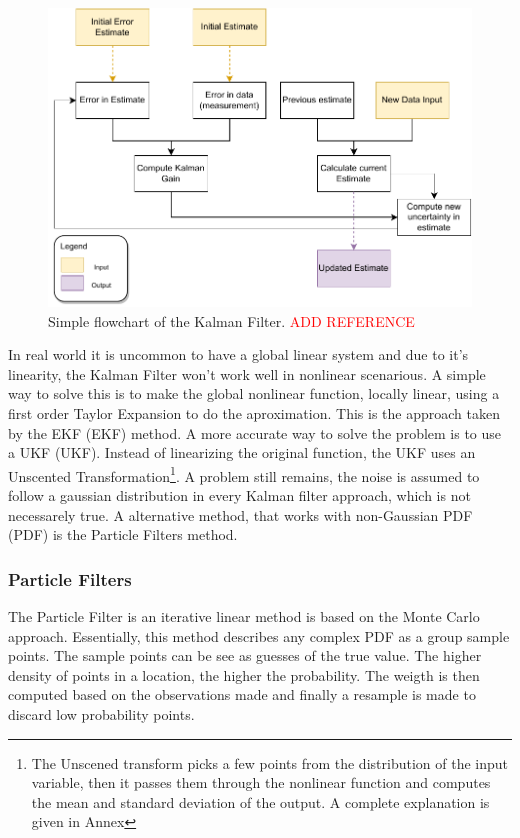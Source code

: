 \begin{figure}[H]
    \centering
    \includegraphics[width=0.5\linewidth]{images/background/Kalman-diagram.pdf}
    \caption{Simple flowchart of the Kalman Filter. \textcolor{red}{ADD REFERENCE}}
    \label{fig: flowchart kalman}
\end{figure}

In real world it is uncommon to have a global linear system and due to it's linearity, the Kalman Filter won't work well in nonlinear scenarious. A simple way to solve this is to make the global nonlinear function, locally linear, using a first order Taylor Expansion to do the aproximation. This is the approach taken by the \acl{EKF} (\acs*{EKF}) method. A more accurate way to solve the problem is to use a \acl*{UKF} (\acs*{UKF}). Instead of linearizing the original function, the \acs*{UKF} uses an Unscented Transformation\footnote{The Unscened transform picks a few points from the distribution of the input variable, then it passes them through the nonlinear function and computes the mean and standard deviation of the output. A complete explanation is given in Annex}. A problem still remains, the noise is assumed to follow a gaussian distribution in every Kalman filter approach, which is not necessarely true. A alternative method, that works with non-Gaussian \acl*{PDF} (\acs*{PDF}) is the Particle Filters method.

\subsubsection{Particle Filters}

The Particle Filter is an iterative linear method is based on the Monte Carlo approach. Essentially, this method describes any complex \acs*{PDF} as a group sample points. The sample points can be see as guesses of the true value. The higher density of points in a location, the higher the probability. The weigth is then computed based on the observations made and finally a resample is made to discard low probability points.

